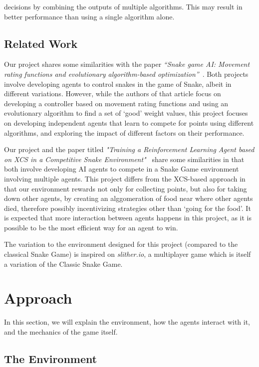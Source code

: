 decisions by combining the outputs of multiple algorithms. This may result in better performance than using a single algorithm alone.

\subsection{Related Work}

Our project shares some similarities with the paper \textit{“Snake game AI: Movement rating functions and evolutionary algorithm-based
optimization”}~\cite{SnakeGameNaturalSelection}. Both projects involve developing agents to control snakes in the game of Snake, albeit in different variations.
However, while the authors of that article focus on developing a controller based on movement rating functions and using an evolutionary algorithm to
find a set of `good' weight values, this project focuses on developing independent agents that learn to compete for points using different algorithms,
and exploring the impact of different factors on their performance.

Our project and the paper titled \textit{"Training a Reinforcement Learning Agent based on XCS in a Competitive Snake Environment"}~\cite{SnakeGameXCS}
share some similarities in that both involve developing AI agents to compete in a Snake Game environment involving multiple agents.
This project differs from the XCS-based approach in that our environment rewards not only for collecting points, but also for taking down other agents,
by creating an alggomeration of food near where other agents died, therefore possibly incentivizing strategies other than `going for the food'.
It is expected that more interaction between agents happens in this project, as it is possible to be the most efficient way for an agent to win.

The variation to the environment designed for this project (compared to the classical Snake Game) is inspired on \textit{slither.io}, a multiplayer game
which is itself a variation of the Classic Snake Game.

\section{Approach}
In this section, we will explain the environment, how the agents interact with it, and the mechanics of the game itself.
\subsection{The Environment}

